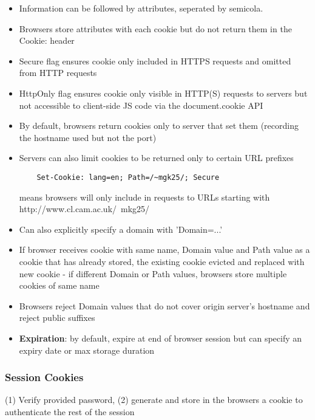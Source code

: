 \documentclass{article}
\begin{document}
\begin{itemize}
	\item Information can be followed by attributes, seperated by semicola.
	\item Browsers store attributes with each cookie but do not return them in the Cookie: header
	\item Secure flag ensures cookie only included in HTTPS requests and omitted from HTTP requests
	\item HttpOnly flag ensures cookie only visible in HTTP(S) requests to servers but not accessible to client-side JS code via the document.cookie API
	
	\item By default, browsers return cookies only to server that set them (recording the hostname used but not the port)
	
	\item Servers can also limit cookies to be returned only to certain URL prefixes
	\begin{lstlisting}
	Set-Cookie: lang=en; Path=/~mgk25/; Secure
	\end{lstlisting}
	means browsers will only include in requests to URLs starting with http://www.cl.cam.ac.uk/~mkg25/
	
	\item Can also explicitly specify a domain with 'Domain=...'
	
	\item If browser receives cookie with same name, Domain value and Path value as a cookie that has already stored, the existing cookie evicted and replaced with new cookie - if different Domain or Path values, browsers store multiple cookies of same name
	
	\item Browsers reject Domain values that do not cover origin server's hostname and reject public suffixes
	
	\item \textbf{Expiration}: by default, expire at end of browser session but can specify an expiry date or max storage duration
	
	
\end{itemize}

\subsubsection{Session Cookies}
(1) Verify provided password, (2) generate and store in the browsers a cookie to authenticate the rest of the session
\end{document}
